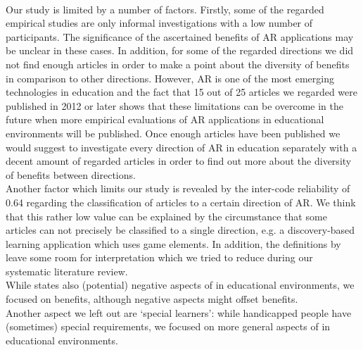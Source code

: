 \\
Our study is limited by a number of factors. Firstly, some of the regarded empirical studies are only informal investigations with a low number of participants. The significance of the ascertained benefits of AR applications may be unclear in these cases. In addition, for some of the regarded directions we did not find enough articles in order to make a point about the diversity of benefits in comparison to other directions. However, AR is one of the most emerging technologies in education and the fact that 15 out of 25 articles we regarded were published in 2012 or later shows that these limitations can be overcome in the future when more empirical evaluations of AR applications in educational environments will be published. Once enough articles have been published we would suggest to investigate every direction of AR in education separately with a decent amount of regarded articles in order to find out more about the diversity of benefits between directions. \\
%
Another factor which limits our study is revealed by the inter-code reliability of 0.64 regarding the classification of articles to a certain direction of AR. We think that this rather low value can be explained by the circumstance that some articles can not precisely be classified to a single direction, e.g. a discovery-based learning application which uses game elements. In addition, the definitions by \cite{Yuen.2011} leave some room for interpretation which we tried to reduce during our systematic literature review.
\\
%
While \cite{Radu.2014} states also (potential) negative aspects of \AR in educational environments, we focused on benefits, although negative aspects might offset benefits. \\
%
Another aspect we left out are ‘special learners’: while handicapped people have (sometimes) special requirements, we focused on more general aspects of \AR in educational environments. \\
% 
% 

